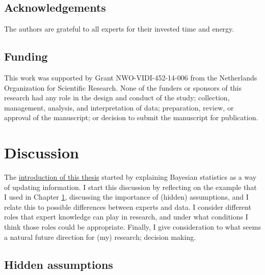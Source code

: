 \documentclass[openright,titlepage,12pt,a4paper]{book}
\begin{document}
\hypertarget{acknowledgements-1}{%
\section*{Acknowledgements}\label{acknowledgements-1}}

The authors are grateful to all experts for their invested time and energy.

\hypertarget{funding}{%
\section*{Funding}\label{funding}}

This work was supported by Grant NWO-VIDI-452-14-006 from the Netherlands Organization for Scientific Research. None of the funders or sponsors of this research had any role in the design and conduct of the study; collection, management, analysis, and interpretation of data; preparation, review, or approval of the manuscript; or decision to submit the manuscript for publication.

\hypertarget{thesisdiscussion}{%
\chapter{Discussion}\label{thesisdiscussion}}

\thispagestyle{empty}

The \protect\hyperlink{introduction}{introduction of this thesis} started by explaining Bayesian statistics as a way of updating information. I start this discussion by reflecting on the example that I used in Chapter \protect\hyperlink{introduction}{1}, discussing the importance of (hidden) assumptions, and I relate this to possible differences between experts and data. I consider different roles that expert knowledge can play in research, and under what conditions I think those roles could be appropriate. Finally, I give consideration to what seems a natural future direction for (my) research; decision making.

\hypertarget{hidden-assumptions}{%
\section{Hidden assumptions}\label{hidden-assumptions}}
\end{document}
